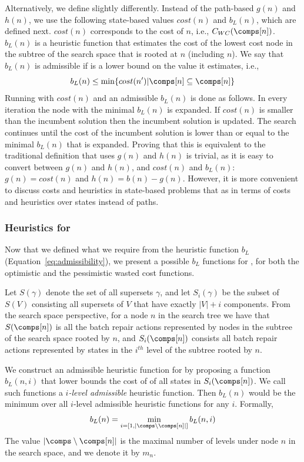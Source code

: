 \documentclass[review]{elsarticle}
\begin{document}
Alternatively, we define \astar{} slightly differently. 
Instead of the path-based $g(n)$ and $h(n)$, we use the following state-based values $cost(n)$ and $b_L(n)$, which are defined next.
$cost(n)$ corresponds to the cost of $n$, i.e., $C_{WC}(\comps[n])$. 
$b_L(n)$ is a heuristic function that estimates the cost of the lowest cost node in the subtree of the \brps{} search space that is rooted at $n$ (including $n$). 
We say that $b_L(n)$ is admissible if is a lower bound on the value it estimates, i.e., 
\begin{equation}
 b_L(n)\leq \min \{cost(n')| \comps[n]\subseteq \comps[n]\}  \label{eq:admissibility}
\end{equation}
Running \astar{} with $cost(n)$ and an admissible $b_L(n)$ is done as follows. In every iteration the node with the minimal $b_L(n)$ is expanded.
If $cost(n)$ is smaller than the incumbent solution then the incumbent solution is updated. The search continues until 
the cost of the incumbent solution is lower than or equal to the minimal $b_L(n)$ that is expanded. 
Proving that this \astar{} is equivalent to the traditional \astar{} definition that uses $g(n)$ and $h(n)$ is trivial, 
as it is easy to convert between $g(n)$ and $h(n)$, and $cost(n)$ and $b_L(n)$: 
$g(n)=cost(n)$ and $h(n)=b(n)-g(n)$. 
However, it is more convenient to discuss costs and heuristics in state-based problems that as \brps{} in terms of costs and heuristics over states  instead of paths. 


\subsubsection{Heuristics for \brps{}}
Now that we defined what we require from the heuristic function $b_L$ (Equation~\ref{eq:admissibility}), 
we present a possible $b_L$ functions for \brps{}, for both the optimistic and the pessimistic wasted cost functions. 


Let $S(\gamma)$ denote the set of all supersets $\gamma$, and let $S_i(\gamma)$ be the subset of $S(V)$ consisting all supersets of $V$ that have exactly $|V|+i$  components. From the search space perspective, 
for a node $n$ in the search tree we have that $S(\comps[n])$ is all the batch repair actions represented by nodes in the subtree  of the search space rooted by $n$, and $S_i(\comps[n])$ consists all batch repair actions represented by states in the $i^{th}$ level of the subtree rooted by $n$. 


We construct an admissible heuristic function for \brps{} by proposing a function $b_L(n,i)$ that lower bounds the cost of of all states in $S_i(\comps[n])$. We call such functions a {\em $i$-level admissible} heuristic function. Then $b_L(n)$ would be the minimum over all
$i$-level admissible heuristic functions for any $i$. Formally, 
\begin{equation}
b_L(n)=\min_{i=[1,|\comps\setminus\comps[n]|]} b_L(n,i)
\label{eq:b-admissible}
\end{equation}
The value $|\comps\setminus\comps[n]|$ is the maximal number of levels under node $n$ in the search space, and we denote it by $m_n$.  
\end{document}
